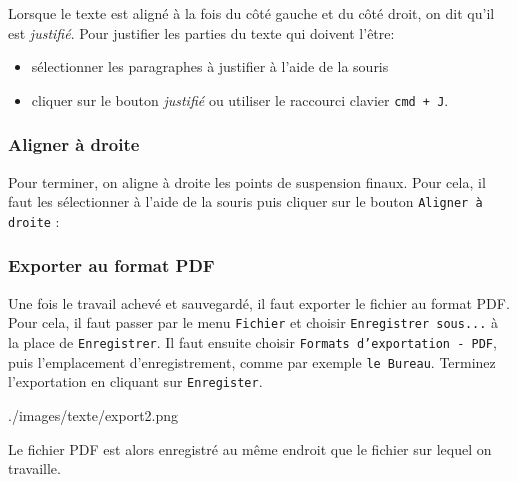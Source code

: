 Lorsque le texte est aligné à la fois du côté gauche et du côté droit, on dit qu'il est \emph{justifié}. Pour justifier les parties du texte qui doivent l'être:

\begin{itemize}
\item sélectionner les paragraphes à justifier à l'aide de la souris
\item cliquer sur le bouton \emph{justifié} ou utiliser le raccourci clavier \texttt{cmd + J}. 
\end{itemize}






\subsubsection{Aligner à droite}  

Pour terminer, on aligne à droite les points de suspension finaux. Pour cela, il faut les sélectionner à l'aide de la souris puis cliquer sur le bouton \texttt{Aligner à droite} :  




\subsubsection{Exporter au format PDF}

Une fois le travail achevé et sauvegardé, il faut exporter le fichier au format PDF. Pour cela, il faut 
passer par le menu \texttt{Fichier} et choisir \texttt{Enregistrer sous...} à la place de \texttt{Enregistrer}. Il faut ensuite choisir \texttt{Formats d'exportation - PDF}, puis l'emplacement d'enregistrement, comme par exemple \texttt{le Bureau}. Terminez l'exportation en cliquant sur \texttt{Enregister}.

%
                {./images/texte/export2.png}{\textwidth}



Le fichier PDF est alors enregistré au même endroit que le fichier sur lequel on travaille.










